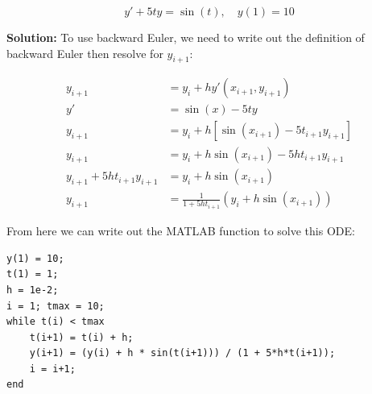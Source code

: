 \documentclass[letterpaper, fontsize=11pt]{scrartcl} %
\numberwithin{equation}{section} %
\numberwithin{figure}{section} %
\numberwithin{table}{section} %
\begin{document}
\begin{enumerate}
\[ y' + 5ty = \sin(t), \quad y(1) = 10\]

\par \textbf{Solution:} To use backward Euler, we need to write out the definition of backward Euler then resolve for $y_{i+1}$:

\begin{align*}
y_{i+1} &= y_i + hy'(x_{i+1},y_{i+1})\\
y' &= \sin(x) - 5ty\\
y_{i+1} &= y_i + h\left[ \sin(x_{i+1}) - 5t_{i+1}y_{i+1}\right] \\
y_{i+1} &= y_i + h \sin(x_{i+1}) - 5ht_{i+1}y_{i+1} \\
y_{i+1} + 5ht_{i+1}y_{i+1}  &= y_i + h \sin(x_{i+1}) \\
y_{i+1} &= \frac{1}{1 + 5ht_{i+1}}\left(y_i + h \sin(x_{i+1}) \right)
\end{align*}

From here we can write out the MATLAB function to solve this ODE:

\begin{lstlisting} 
y(1) = 10; 
t(1) = 1;
h = 1e-2;
i = 1; tmax = 10;
while t(i) < tmax
	t(i+1) = t(i) + h;
	y(i+1) = (y(i) + h * sin(t(i+1))) / (1 + 5*h*t(i+1));
	i = i+1;
end

\end{lstlisting}

\end{enumerate}

\end{document}

